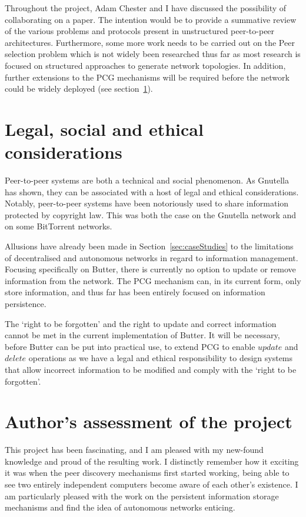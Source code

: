 Throughout the project, Adam Chester and I have discussed the possibility of collaborating on a paper. The intention would be to provide a summative review of the various problems and protocols present in unstructured peer-to-peer architectures. Furthermore, some more work needs to be carried out on the Peer selection problem which is not widely been researched thus far as most research is focused on structured approaches to generate network topologies. In addition, further extensions to the PCG mechanisms will be required before the network could be widely deployed (see section~\ref{legalSocialEthical}).


\section{Legal, social and ethical considerations}
\label{legalSocialEthical}

Peer-to-peer systems are both a technical and social phenomenon\cite{glorioso2010social}. As Gnutella has shown, they can be associated with a host of legal and ethical considerations. Notably, peer-to-peer systems have been notoriously used to share information protected by copyright law. This was both the case on the Gnutella network and on some BitTorrent networks.

Allusions have already been made in Section~\ref{sec:caseStudies} to the limitations of decentralised and autonomous networks in regard to information management. Focusing specifically on Butter, there is currently no option to update or remove information from the network. The PCG mechanism can, in its current form, only store information, and thus far has been entirely focused on information persistence.

The `right to be forgotten'\cite{globocnjik2020right} and the right to update and correct information cannot be met in the current implementation of Butter. It will be necessary, before Butter can be put into practical use, to extend PCG to enable $update$ and $delete$ operations as we have a legal and ethical responsibility to design systems that allow incorrect information to be modified and comply with the `right to be forgotten'.


\section{Author's assessment of the project}

This project has been fascinating, and I am pleased with my new-found knowledge and proud of the resulting work. I distinctly remember how it exciting it was when the peer discovery mechanisms first started working, being able to see two entirely independent computers become aware of each other's existence. I am particularly pleased with the work on the persistent information storage mechanisms and find the idea of autonomous networks enticing.

